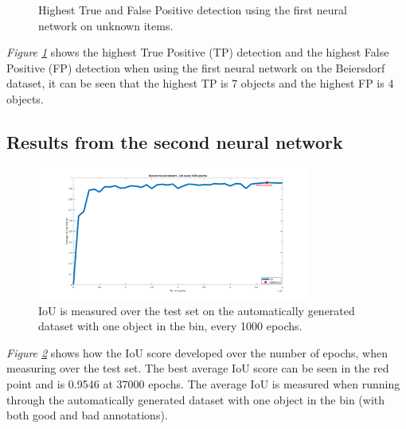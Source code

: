 \begin{figure}[h]
 \centering
 \hfill
 
 \caption{Highest True and False Positive detection using the first neural network on unknown items.}
 \label{fig:v1max}
\end{figure}
\textit{Figure \ref{fig:v1max}} shows the highest True Positive (TP) detection and the highest False Positive (FP) detection when using the first neural network on the Beiersdorf dataset, it can be seen that the highest TP is 7 objects and the highest FP is 4 objects.
\clearpage

\subsection{Results from the second neural network}\label{sec:secondneural}

\begin{figure}[h]
 \centering
 \includegraphics[width=0.8\textwidth, trim={5cm 0 4cm 0},clip]{graphics/results/secondneuralnetworkauto.png}
 \caption{IoU is measured over the test set on the automatically generated dataset with one object in the bin, every 1000 epochs.}
 \label{fig:v2neuralnetwork}
\end{figure}
\textit{Figure \ref{fig:v2neuralnetwork}} shows how the IoU score developed over the number of epochs, when measuring over the test set. The best average IoU score can be seen in the red point and is 0.9546 at 37000 epochs. The average IoU is measured when running through the automatically generated dataset with one object in the bin (with both good and bad annotations).


